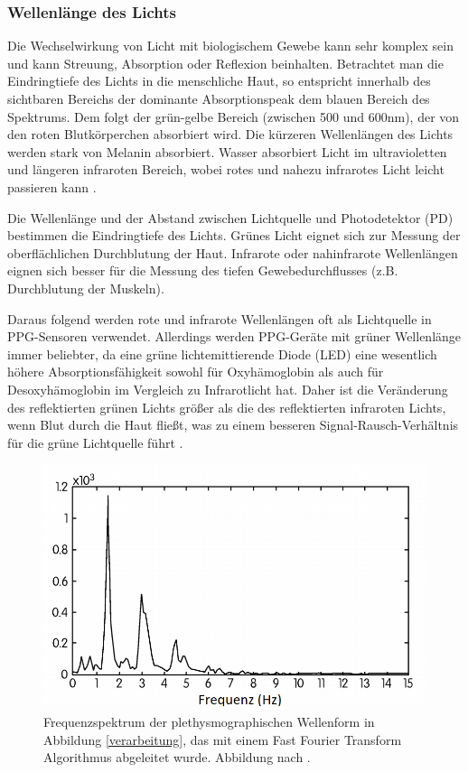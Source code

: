 \documentclass[10pt,a4paper,headinclude,twoside, plainheadsepline, open=right, numbers=noenddot, twocolumn]{article}
\begin{document}
\subsubsection{Wellenlänge des Lichts}
\label{wellenlaenge des lichts}

Die Wechselwirkung von Licht mit biologischem Gewebe kann sehr komplex sein und kann Streuung, Absorption oder Reflexion beinhalten.
Betrachtet man die Eindringtiefe des Lichts in die menschliche Haut, so entspricht innerhalb des sichtbaren Bereichs der dominante Absorptionspeak dem blauen Bereich des Spektrums.
Dem folgt der grün-gelbe Bereich (zwischen 500 und 600nm), der von den roten Blutkörperchen absorbiert wird.
Die kürzeren Wellenlängen des Lichts werden stark von Melanin absorbiert.
Wasser absorbiert Licht im ultravioletten und längeren infraroten Bereich, wobei rotes und nahezu infrarotes Licht leicht passieren kann \cite{anderson1981optics}.

Die Wellenlänge und der Abstand zwischen Lichtquelle und Photodetektor (PD) bestimmen die Eindringtiefe des Lichts. 
Grünes Licht eignet sich zur Messung der oberflächlichen Durchblutung der Haut.
Infrarote oder nahinfrarote Wellenlängen eignen sich besser für die Messung des tiefen Gewebedurchflusses (z.B. Durchblutung der Muskeln). 

Daraus folgend werden rote und infrarote Wellenlängen oft als Lichtquelle in PPG-Sensoren verwendet.
Allerdings werden PPG-Geräte mit grüner Wellenlänge  immer beliebter, da eine grüne lichtemittierende Diode (LED) eine wesentlich höhere Absorptionsfähigkeit sowohl für Oxyhämoglobin als auch für Desoxyhämoglobin im Vergleich zu Infrarotlicht hat.
Daher ist die Veränderung des reflektierten grünen Lichts größer als die des reflektierten infraroten Lichts, wenn Blut durch die Haut fließt, was zu einem besseren Signal-Rausch-Verhältnis für die grüne Lichtquelle führt \cite{john2007photopletysmography}.


\begin{figure}[ht]
	\centering
	\includegraphics[width=0.6\linewidth]{images/welle_fft.png}
	\caption{Frequenzspektrum der plethysmographischen Wellenform in Abbildung \ref{verarbeitung}, das mit einem Fast Fourier Transform Algorithmus abgeleitet wurde. Abbildung nach \cite{mcpherson2015systems}.}
	\label{fft}
\end{figure}
\end{document}
